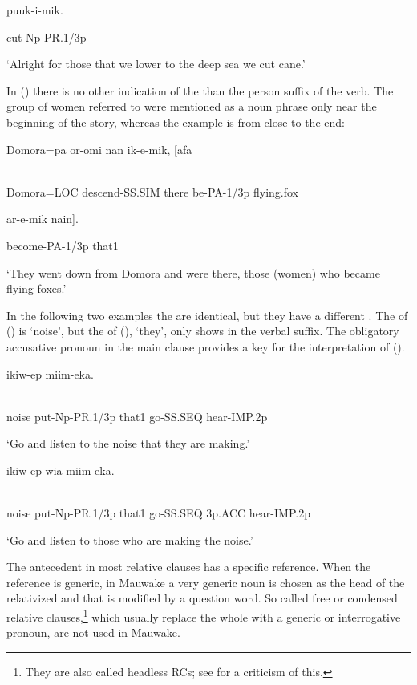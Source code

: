 puuk-i-mik.

cut-Np-PR.1/3p

`Alright for those that we lower to the deep sea we cut cane.'

In () there is no other indication of the   than the person suffix of the verb. The group of women referred to were mentioned as a noun phrase only near the beginning of the story, whereas the example is from close to the end:

\ea%
\label{ex:x1556}
\gll Domora=pa  or-omi  nan  ik-e-mik,  [afa  \\
      \\
\glt
\z

Domora=LOC  descend-SS.SIM  there  be-PA-1/3p  flying.fox

ar-e-mik  nain].

become-PA-1/3p  that1

`They went down from Domora and were there, those (women) who became flying foxes.'

In the following two examples the  are identical, but they have a different . The  of () is  `noise', but the  of (),  `they', only shows in the verbal suffix. The obligatory accusative pronoun in the main clause provides a key for the interpretation of ().

\ea%
\label{ex:x1557}
  ikiw-ep  miim-eka. \\
      \\
\glt
\z

noise  put-Np-PR.1/3p  that1  go-SS.SEQ  hear-IMP.2p

`Go and listen to the noise that they are making.'

\ea%
\label{ex:x1558}
  ikiw-ep  wia  miim-eka. \\
      \\
\glt
\z

noise  put-Np-PR.1/3p  that1  go-SS.SEQ  3p.ACC  hear-IMP.2p

`Go and listen to those who are making the noise.'

The antecedent in most relative clauses has a specific reference. When the reference is generic, in Mauwake a very generic noun is chosen as the head of the relativized  and that is modified by a question word. So called free \citep[213]{Andrews2007b} or condensed \citep[359]{Dixon2010b} relative clauses,\footnote{They are also called headless RCs; see \citet[317,360]{Dixon2010b} for a criticism of this.} which usually replace the whole  with a generic or interrogative pronoun, are not used in Mauwake. 

